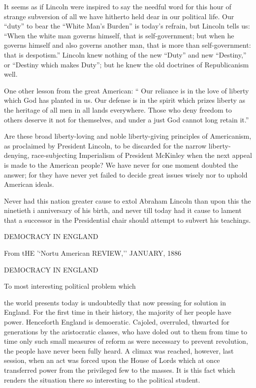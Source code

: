 \documentclass[11pt,openany]{book}
\begin{document}
It seems as if Lincoln were inspired to say the needful word for this hour of strange subversion of all we have hitherto held dear in our political life. Our ``duty'' to bear the ``White Man's Burden'' is today's refrain, but Lincoln tells us: ``When the white man governs himself, that is self-government; but when he governs himself and also governs another man, that is more than self-government: that is despotism.'' Lincoln knew nothing of the new ``Duty'' and new ``Destiny,'' or ``Destiny which makes Duty''; but he knew the old doctrines of Republicanism well.

One other lesson from the great American: `` Our reliance is in the love of liberty which God has planted in us. Our defense is in the spirit which prizes liberty as the heritage of all men in all lands everywhere. Those who deny freedom to others deserve it not for themselves, and under a just God cannot long retain it.''

Are these broad liberty-loving and noble liberty-giving principles of Americanism, as proclaimed by President Lincoln, to be discarded for the narrow liberty-denying, race-subjecting Imperialism of President McKinley when the next appeal is made to the American people? We have never for one moment doubted the answer; for they have never yet failed to decide great issues wisely nor to uphold American ideals.

Never had this nation greater cause to extol Abraham Lincoln than upon this the ninetieth i anniversary of his birth, and never till today had it cause to lament that a successor in the Presidential chair should attempt to subvert his teachings.

DEMOCRACY IN ENGLAND

From tHE '`Nortu American REVIEW,'' JANUARY, 1886

DEMOCRACY IN ENGLAND

To most interesting political problem which

the world presents today is undoubtedly that now pressing for solution in England. For the first time in their history, the majority of her people have power. Henceforth England is demoeratic. Cajoled, overruled, thwarted for generations by the aristocratic classes, who have doled out to them from time to time only such small measures of reform as were necessary to prevent revolution, the people have never been fully heard. A climax was reached, however, last session, when an act was forced upon the House of Lords which at once transferred power from the privileged few to the masses. It is this fact which renders the situation there so interesting to the political student.
\end{document}
